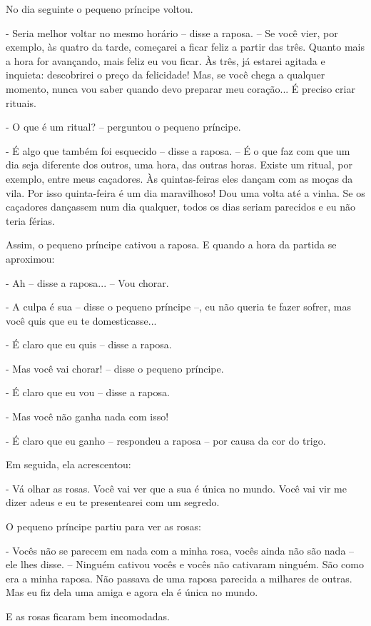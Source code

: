 No dia seguinte o pequeno príncipe voltou.

- Seria melhor voltar no mesmo horário -- disse a raposa. -- Se você
vier, por exemplo, às quatro da tarde, começarei a ficar feliz a partir
das três. Quanto mais a hora for avançando, mais feliz eu vou ficar. Às
três, já estarei agitada e inquieta: descobrirei o preço da felicidade!
Mas, se você chega a qualquer momento, nunca vou saber quando devo
preparar meu coração... É preciso criar rituais.

- O que é um ritual? -- perguntou o pequeno príncipe.

- É algo que também foi esquecido -- disse a raposa. -- É o que faz com
que um dia seja diferente dos outros, uma hora, das outras horas. Existe
um ritual, por exemplo, entre meus caçadores. Às quintas-feiras eles
dançam com as moças da vila. Por isso quinta-feira é um dia maravilhoso!
Dou uma volta até a vinha. Se os caçadores dançassem num dia qualquer,
todos os dias seriam parecidos e eu não teria férias.

Assim, o pequeno príncipe cativou a raposa. E quando a hora da partida
se aproximou:

- Ah -- disse a raposa... -- Vou chorar.

- A culpa é sua -- disse o pequeno príncipe --, eu não queria te fazer
sofrer, mas você quis que eu te domesticasse...

- É claro que eu quis -- disse a raposa.

- Mas você vai chorar! -- disse o pequeno príncipe.

- É claro que eu vou -- disse a raposa.

- Mas você não ganha nada com isso!

- É claro que eu ganho -- respondeu a raposa -- por causa da cor do
trigo.

Em seguida, ela acrescentou:

- Vá olhar as rosas. Você vai ver que a sua é única no mundo. Você vai
vir me dizer adeus e eu te presentearei com um segredo.

O pequeno príncipe partiu para ver as rosas:

- Vocês não se parecem em nada com a minha rosa, vocês ainda não são
nada -- ele lhes disse. -- Ninguém cativou vocês e vocês não cativaram
ninguém. São como era a minha raposa. Não passava de uma raposa parecida
a milhares de outras. Mas eu fiz dela uma amiga e agora ela é única no
mundo.

E as rosas ficaram bem incomodadas.

